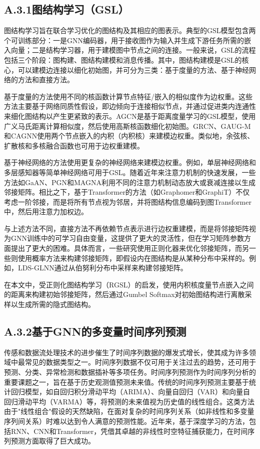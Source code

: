 \subsection*{A.3.1\quad 图结构学习（GSL）}

图结构学习旨在联合学习优化的图结构及其相应的图表示。典型的GSL模型包含两个可训练部分：一是GNN编码器，用于接收图作为输入并生成下游任务所需的嵌入向量；二是结构学习器，用于建模图中节点之间的连接。一般来说，GSL的流程包括三个阶段：图构建、图结构建模和消息传播。其中，图结构建模是GSL的核心，可以建模边连接以细化初始图，并可分为三类：基于度量的方法、基于神经网络的方法和直接方法。

基于度量的方法使用不同的核函数计算节点特征/嵌入的相似度作为边权重。这些方法主要基于网络同质性假设，即边倾向于连接相似节点，并通过促进类内连通性来细化图结构以产生更紧致的表示。AGCN是基于距离度量学习的GSL模型，使用广义马氏距离计算相似度，然后使用高斯核函数细化初始图。GRCN、GAUG-M和CAGNN使用两个节点嵌入的内积（内积核）来建模边权重。类似地，余弦核、扩散核和多核融合函数也可用于边权重建模。

基于神经网络的方法使用更复杂的神经网络来建模边权重。例如，单层神经网络和多层感知器等简单神经网络可用于GSL。随着近年来注意力机制的快速发展，一些方法如GaAN、PGN和MAGNA利用不同的注意力机制动态放大或衰减连接以生成邻接矩阵。相比之下，基于Transformer的方法（如Graphomer和GraphiT）不仅考虑一阶邻接，而是将所有节点视为邻居，并将图结构信息编码到图Transformer中，然后用注意力加权边。

与上述方法不同，直接方法不再依赖节点表示进行边权重建模，而是将邻接矩阵视为GNN训练中的可学习自由变量，这提供了更大的灵活性，但在学习矩阵参数方面提出了更大的困难。具体而言，一些研究使用正则化器来优化邻接矩阵，而另一些则使用概率方法来构建邻接矩阵，即假设内在图结构是从某种分布中采样的。例如，LDS-GLNN通过从伯努利分布中采样来构建邻接矩阵。

在本文中，受正则化图结构学习（RGSL）的启发，使用内积核度量节点嵌入之间的距离来构建初始邻接矩阵，然后通过Gumbel Softmax对初始图结构进行离散采样以生成所需的隐式图结构。

\subsection*{A.3.2\quad 基于GNN的多变量时间序列预测}

传感和数据流处理技术的进步催生了时间序列数据的爆发式增长，使其成为许多领域中最常见的数据类型之一。时间序列数据不仅可用于关注过去的趋势，还可用于预测、分类、异常检测和数据插补等多项任务。时间序列预测作为时间序列分析的重要课题之一，旨在基于历史观测值预测未来值。传统的时间序列预测主要基于统计回归模型，如自回归积分滑动平均（ARIMA）、向量自回归（VAR）和向量自回归滑动平均（VARMA）等，将预测的未来值视为历史值的线性组合。这类方法由于"线性组合"假设的天然缺陷，在面对复杂的时间序列关系（如非线性和多变量序列间关系）时难以达到令人满意的预测性能。近年来，基于深度学习的方法，包括RNN、CNN和Transformer，凭借其卓越的非线性时空特征捕获能力，在时间序列预测方面取得了巨大成功。

